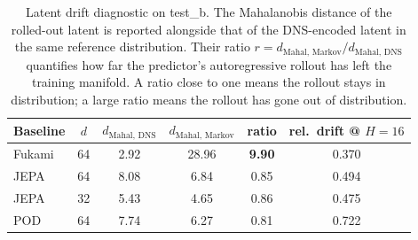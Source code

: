 
\begin{table}
  \centering
  \caption{Latent drift diagnostic on test\_b. The Mahalanobis distance of the
  rolled-out latent is reported alongside that of the DNS-encoded latent in the same
  reference distribution. Their ratio $r = d_{\text{Mahal, Markov}} / d_{\text{Mahal, DNS}}$
  quantifies how far the predictor's autoregressive rollout has left the training
  manifold. A ratio close to one means the rollout stays in distribution; a large
  ratio means the rollout has gone out of distribution.}
  \label{tab:latent_drift}
  \small
  \begin{tabular}{l c c c c c}
    \toprule
    Baseline & $d$ & $d_{\text{Mahal, DNS}}$ & $d_{\text{Mahal, Markov}}$ & ratio & rel.\ drift @ $H{=}16$ \\
    \midrule
    Fukami & 64 & 2.92 & 28.96 & \textbf{9.90} & 0.370 \\
    JEPA   & 64 & 8.08 & 6.84  & 0.85          & 0.494 \\
    JEPA   & 32 & 5.43 & 4.65  & 0.86          & 0.475 \\
    POD    & 64 & 7.74 & 6.27  & 0.81          & 0.722 \\
    \bottomrule
  \end{tabular}
\end{table}
